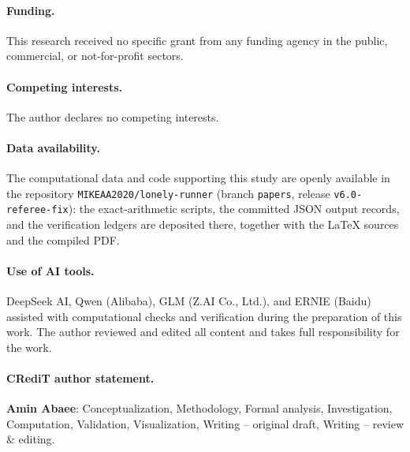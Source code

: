 \documentclass[11pt,a4paper]{article}
\numberwithin{equation}{section}
\theoremstyle{plain}
\theoremstyle{plain}
\theoremstyle{definition}
\theoremstyle{remark}
\begin{document}
\paragraph{Funding.} This research received no specific grant from any
funding agency in the public, commercial, or not-for-profit sectors.

\paragraph{Competing interests.} The author declares no competing
interests.

\paragraph{Data availability.} The computational data and code
supporting this study are openly available in the repository
\texttt{MIKEAA2020/lonely-runner} (branch \texttt{papers}, release
\texttt{v6.0-referee-fix}): the exact-arithmetic scripts, the committed
JSON output records, and the verification ledgers are deposited there,
together with the \LaTeX{} sources and the compiled PDF.

\paragraph{Use of AI tools.} DeepSeek AI, Qwen (Alibaba), GLM (Z.AI Co.,
Ltd.), and ERNIE (Baidu) assisted with computational checks and
verification during the preparation of this work. The author reviewed and
edited all content and takes full responsibility for the work.

\paragraph{CRediT author statement.} \textbf{Amin Abaee}: Conceptualization,
Methodology, Formal analysis, Investigation, Computation, Validation,
Visualization, Writing -- original draft, Writing -- review \& editing.
\end{document}
